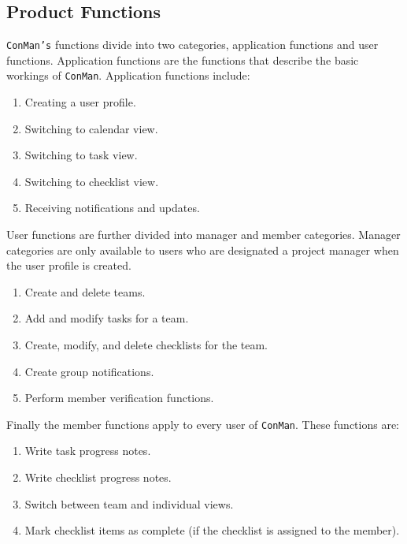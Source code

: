 \documentclass{article}
\begin{document}
\subsection{Product Functions}
\texttt{ConMan's} functions divide into two categories, application functions and user functions.  Application functions are the functions that describe the basic workings of \texttt{ConMan}.  Application functions include:
\begin{enumerate}
    \item Creating a user profile.
    \item Switching to calendar view.
    \item Switching to task view.
    \item Switching to checklist view.
    \item Receiving notifications and updates.
\end{enumerate}

User functions are further divided into manager and member categories.
Manager categories are only available to users who are designated a project manager when the user profile is created.
\begin{enumerate}
    \item Create and delete teams.
    \item Add and modify tasks for a team.
    \item Create, modify, and delete checklists for the team.
    \item Create group notifications.
    \item Perform member verification functions.
\end{enumerate}
Finally the member functions apply to every user of \texttt{ConMan}.  These functions are:
\begin{enumerate}
    \item Write task progress notes.
    \item Write checklist progress notes.
    \item Switch between team and individual views.
    \item Mark checklist items as complete (if the checklist is assigned to the member).
\end{enumerate}
\end{document}
